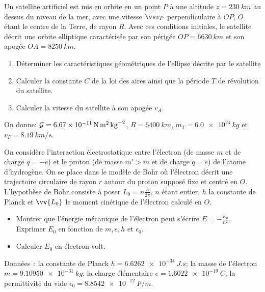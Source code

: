 \begin{exercice}%
  Un satellite artificiel est mis en orbite en un point \(P\) à une altitude
  \(z = \SI{230}{km}\) au dessus du niveau de la mer, avec une vitesse
  \(\vvv_P\) perpendiculaire à \(OP\), \(O\) étant le centre de la Terre, de
  rayon \(R\). Avec ces conditions initiales, le satellite décrit une orbite
  elliptique caractérisée par son périgée \(OP = \SI{6630}{km}\) et son apogée
  \(OA = \SI{8250}{km}\).
  \begin{enumerate}
    \item Déterminer les caractéristiques géométriques de l'ellipse décrite par
      le satellite
    \item Calculer la constante \(C\) de la loi des aires ainsi que la période
      \(T\) de révolution du satellite.
    \item Calculer la vitesse du satellite à son apogée \(v_A\).
  \end{enumerate}
  On donne: \(\mathcal{G} = \SI{6.67e-11}{N.m^2.kg^{-2}}\), \(R = \SI{6400}{km}\),
  \(m_T = \SI{6.0e24}{kg}\) et \(v_P = \SI{8.19}{km/s}\).
\end{exercice}
\begin{exercice}%
  On considère l'interaction électrostatique entre l'électron (de masse \(m\)
  et de charge \(q = -e\)) et le proton (de masse \(m' > m\) et de charge \(q =
  e\)) de l'atome d'hydrogène.
  On se place dans le modèle de Bohr où l'électron décrit une trajectoire
  circulaire de rayon \(r\) autour du proton supposé fixe et centré en \(O\).
  L'hypothèse de Bohr consiste à poser \(L_0 = n\frac{h}{2\pi}\), \(n\) étant
  entier, \(h\) la constante de Planck et \(\vv{L_0}\) le moment cinétique de
  l'électron calculé en \(O\).
  \begin{itemize}
    \item Montrer que l'énergie mécanique de l'électron peut s'écrire \(E =
      -\frac{E_0}{n^2}\). Exprimer \(E_0\) en fonction de \(m, e, h\) et
      \(\epsilon_0\).
    \item Calculer \(E_0\) en électron-volt.
  \end{itemize}
  Données~: la constante de Planck \(h = \SI{6,6262e-34}{J.s}\); la masse de
  l'électron \(m = \SI{9,10950e-31}{kg}\); la charge élémentaire
  \(e = \SI{1,6022e-19}{C}\); la permittivité du vide
  \(\epsilon_0 = \SI{8,8542e-12}{F/m}\).
\end{exercice}%
